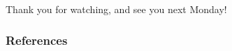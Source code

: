 \documentclass[12pt,english,dvipsnames,aspectratio=169,handout]{beamer}\usepackage[]{graphicx}\usepackage[]{xcolor}
\begin{document}
\begin{frame}
\begin{center}
    \LARGE Thank you for watching, and see you next Monday!
\end{center}
\end{frame}


\begin{frame}
\frametitle{References}


\vspace{5cm}
\end{frame}
\end{document}
